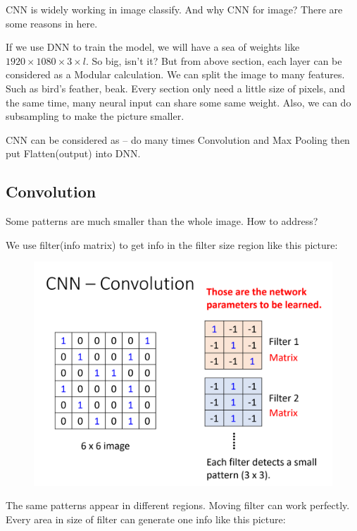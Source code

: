 \documentclass{article}
\begin{document}
CNN is widely working in image classify. And why CNN for image? There are some reasons in here.

If we use DNN to train the model, we will have a sea of weights like $1920\times 1080\times 3 \times l$. So big, isn't it? But from above section, each layer can be considered as a Modular calculation. We can split the image to many features. Such as bird's feather, beak. Every section only need a little size of pixels, and the same time, many neural input can share some same weight. Also, we can do subsampling to make the picture smaller.

CNN can be considered as -- do many times Convolution and Max Pooling then put Flatten(output) into DNN.

\subsection{Convolution}

Some patterns are much smaller than the whole image. How to address?

We use filter(info matrix) to get info in the filter size region like this picture:

\begin{figure}[htbp]
  \centering
  \includegraphics[scale=0.3]{pic/Property 1.png}
  \label{fig:my_label}
\end{figure}

The same patterns appear in different regions. Moving filter can work perfectly. Every area in size of filter can generate one info like this picture:
\end{document}
